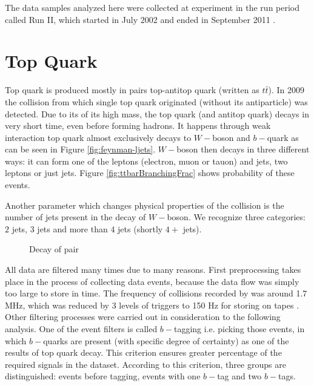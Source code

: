 The data samples analyzed here were collected at \dzero experiment in the run period called Run II, which started in July 2002 and ended in September 2011 \cite{Yuntse}.

\section{Top Quark} \label{sec:topQuark}
Top quark is produced mostly in pairs top-antitop quark (written as $t\bar{t}$). In 2009 the collision from which single top quark originated  (without its antiparticle) was detected. Due to its of its high mass, the top quark (and antitop quark) decays in very short time, even before forming hadrons. It happens through weak interaction top quark almost exclusively decays to $W-$boson and $b-$quark as can be seen in Figure \ref{fig:feynman-ljets}. $W-$boson then decays in three different ways: it can form one of the leptons (electron, muon or tauon) and jets, two leptons or just jets. Figure \ref{fig:ttbarBranchingFrac} shows probability of these events. 

Another parameter which changes physical properties of the collision is the number of jets present in the decay of $W-$boson. We recognize three categories: $2$ jets, $3$ jets and more than $4$ jets (shortly $4+$ jets).

\begin{figure}[thb]
  \centering
  \caption{Decay of \ttbar pair}
\end{figure} 

All data are filtered many times due to many reasons. First preprocessing takes  place in the process of collecting data events, because the data flow was simply too large to store in time. The frequency of collisions recorded by \dzero was around 1.7 MHz, which was reduced by 3 levels of triggers to 150 Hz for storing on tapes \cite{Yuntse}. Other filtering processes were carried out in consideration to the following analysis. One of the event filters is called $b-$tagging i.e. picking those events, in which $b-$quarks are present (with specific degree of certainty) as one of the results of top quark decay. This criterion ensures greater percentage of the required signals in the dataset. According to this criterion, three groups are distinguished: events before tagging, events with one $b-$tag and two $b-$tags.

